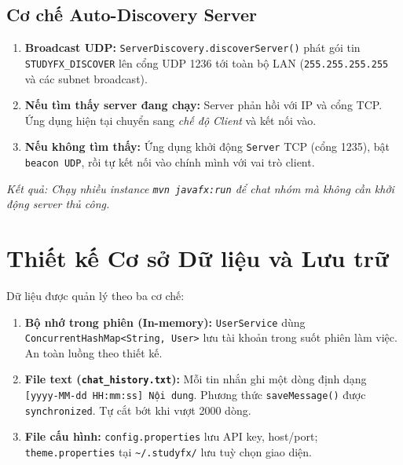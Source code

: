\documentclass[12pt, a4paper, oneside]{report}
\newcommand{\code}[1]{\texttt{\color{hustblue!80!black}#1}}
\begin{document}
\subsection{Cơ chế Auto-Discovery Server}

\begin{tcolorbox}[infostyle, title={Quy trình khởi động tự động (UDP Auto-Discovery)}]
\begin{enumerate}[leftmargin=1.8em, itemsep=5pt]
  \item \textbf{Broadcast UDP:} \code{ServerDiscovery.discoverServer()} phát
    gói tin \code{STUDYFX\_DISCOVER} lên cổng UDP 1236 tới toàn bộ LAN
    (\code{255.255.255.255} và các subnet broadcast).

  \item \textbf{Nếu tìm thấy server đang chạy:} Server phản hồi với IP và cổng
    TCP. Ứng dụng hiện tại chuyển sang \textit{chế độ Client} và kết nối vào.

  \item \textbf{Nếu không tìm thấy:} Ứng dụng khởi động \code{Server} TCP (cổng
    1235), bật \code{beacon UDP}, rồi tự kết nối vào chính mình với vai trò client.
\end{enumerate}
\vspace{4pt}
\textit{Kết quả: Chạy nhiều instance \code{mvn javafx:run} để chat nhóm mà không
cần khởi động server thủ công.}
\end{tcolorbox}

\section{Thiết kế Cơ sở Dữ liệu và Lưu trữ}

Dữ liệu được quản lý theo ba cơ chế:

\begin{enumerate}[leftmargin=2em, itemsep=6pt]
  \item \textbf{Bộ nhớ trong phiên (In-memory):}
    \code{UserService} dùng \code{ConcurrentHashMap<String, User>}
    lưu tài khoản trong suốt phiên làm việc. An toàn luồng theo thiết kế.

  \item \textbf{File text (\code{chat\_history.txt}):}
    Mỗi tin nhắn ghi một dòng định dạng \code{[yyyy-MM-dd HH:mm:ss] Nội dung}.
    Phương thức \code{saveMessage()} được \code{synchronized}. Tự cắt bớt khi
    vượt 2000 dòng.

  \item \textbf{File cấu hình:}
    \code{config.properties} lưu API key, host/port;
    \code{theme.properties} tại \code{\textasciitilde/.studyfx/} lưu tuỳ chọn giao diện.
\end{enumerate}
\end{document}
